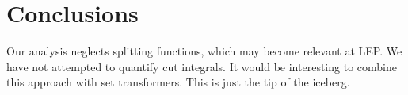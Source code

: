 \section{Conclusions}\label{sec:conclusions}

Our analysis neglects splitting functions, which may become relevant at
LEP. We have not attempted to quantify cut integrals. It would be
interesting to combine this approach with set transformers. This is just
the tip of the iceberg.

